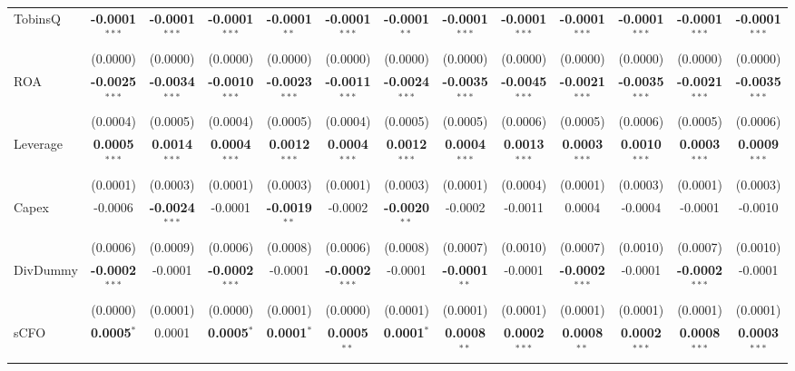\begin{landscape}
\begin{table}[H]
\begin{tabular}{lcccccccccccc}
TobinsQ & \textbf{-0.0001}$^{***}$ & \textbf{-0.0001}$^{***}$ & \textbf{-0.0001}$^{***}$ & \textbf{-0.0001}$^{**}$ & \textbf{-0.0001}$^{***}$ & \textbf{-0.0001}$^{**}$ & \textbf{-0.0001}$^{***}$ & \textbf{-0.0001}$^{***}$ & \textbf{-0.0001}$^{***}$ & \textbf{-0.0001}$^{***}$ & \textbf{-0.0001}$^{***}$ & \textbf{-0.0001}$^{***}$ \\
 & (0.0000) & (0.0000) & (0.0000) & (0.0000) & (0.0000) & (0.0000) & (0.0000) & (0.0000) & (0.0000) & (0.0000) & (0.0000) & (0.0000) \\
ROA & \textbf{-0.0025}$^{***}$ & \textbf{-0.0034}$^{***}$ & \textbf{-0.0010}$^{***}$ & \textbf{-0.0023}$^{***}$ & \textbf{-0.0011}$^{***}$ & \textbf{-0.0024}$^{***}$ & \textbf{-0.0035}$^{***}$ & \textbf{-0.0045}$^{***}$ & \textbf{-0.0021}$^{***}$ & \textbf{-0.0035}$^{***}$ & \textbf{-0.0021}$^{***}$ & \textbf{-0.0035}$^{***}$ \\
 & (0.0004) & (0.0005) & (0.0004) & (0.0005) & (0.0004) & (0.0005) & (0.0005) & (0.0006) & (0.0005) & (0.0006) & (0.0005) & (0.0006) \\
Leverage & \textbf{0.0005}$^{***}$ & \textbf{0.0014}$^{***}$ & \textbf{0.0004}$^{***}$ & \textbf{0.0012}$^{***}$ & \textbf{0.0004}$^{***}$ & \textbf{0.0012}$^{***}$ & \textbf{0.0004}$^{***}$ & \textbf{0.0013}$^{***}$ & \textbf{0.0003}$^{***}$ & \textbf{0.0010}$^{***}$ & \textbf{0.0003}$^{***}$ & \textbf{0.0009}$^{***}$ \\
 & (0.0001) & (0.0003) & (0.0001) & (0.0003) & (0.0001) & (0.0003) & (0.0001) & (0.0004) & (0.0001) & (0.0003) & (0.0001) & (0.0003) \\
Capex & -0.0006 & \textbf{-0.0024}$^{***}$ & -0.0001 & \textbf{-0.0019}$^{**}$ & -0.0002 & \textbf{-0.0020}$^{**}$ & -0.0002 & -0.0011 & 0.0004 & -0.0004 & -0.0001 & -0.0010 \\
 & (0.0006) & (0.0009) & (0.0006) & (0.0008) & (0.0006) & (0.0008) & (0.0007) & (0.0010) & (0.0007) & (0.0010) & (0.0007) & (0.0010) \\
DivDummy & \textbf{-0.0002}$^{***}$ & -0.0001 & \textbf{-0.0002}$^{***}$ & -0.0001 & \textbf{-0.0002}$^{***}$ & -0.0001 & \textbf{-0.0001}$^{**}$ & -0.0001 & \textbf{-0.0002}$^{***}$ & -0.0001 & \textbf{-0.0002}$^{***}$ & -0.0001 \\
 & (0.0000) & (0.0001) & (0.0000) & (0.0001) & (0.0000) & (0.0001) & (0.0001) & (0.0001) & (0.0001) & (0.0001) & (0.0001) & (0.0001) \\
sCFO & \textbf{0.0005}$^{*}$ & 0.0001 & \textbf{0.0005}$^{*}$ & \textbf{0.0001}$^{*}$ & \textbf{0.0005}$^{**}$ & \textbf{0.0001}$^{*}$ & \textbf{0.0008}$^{**}$ & \textbf{0.0002}$^{***}$ & \textbf{0.0008}$^{**}$ & \textbf{0.0002}$^{***}$ & \textbf{0.0008}$^{***}$ & \textbf{0.0003}$^{***}$ \\

\end{tabular}
\end{table}
\end{landscape}
